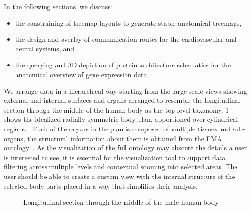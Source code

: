 In the following sections, we discuss:
\begin{itemize}
  \item the constraining of treemap layouts to generate stable anatomical treemaps,
  \item the design and overlay of communication routes for the cardiovascular and neural systems, and
  \item the querying and 3D depiction of protein architecture schematics for the anatomical overview of gene expression data.
\end{itemize}

We arrange data in a hierarchical way starting from the large-scale views showing external and internal surfaces and organs
arranged to resemble the longitudinal section through the middle of the human body as the top-level taxonomy.
\cref{fig:application} shows the idealized radially symmetric body plan, apportioned over cylindrical regions.
.
Each of the organs in the plan is composed of multiple tissues and sub-organs, the structural information about them is obtained from the FMA ontology~\cite{RM03}. As the visualization of the full ontology may obscure the details a user is interested to see, it is essential for the visualization tool to support data filtering across multiple levels and contextual zooming into selected areas. The user should be able to create a custom view with the internal structure of the selected body parts placed in a way that simplifies their analysis.

\begin{figure}
\centering
  \caption{Longitudinal section through the middle of the male human body}
  \label{fig:application}
\end{figure}
